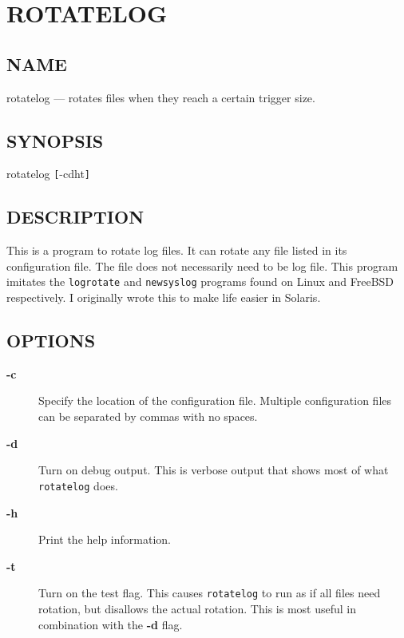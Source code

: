 \documentclass{article}
\begin{document}
\section{ROTATELOG}%

\subsection*{NAME}
rotatelog --- rotates files when they reach a certain trigger size.

\subsection*{SYNOPSIS}
rotatelog {\tt [}-cdht{\tt ]}

\subsection*{DESCRIPTION}
This is a program to rotate log files.  It can rotate any file listed in
its configuration file.  The file does not necessarily need to be log
file.  This program imitates the {\tt logrotate} and {\tt newsyslog} programs
found on Linux and FreeBSD respectively.  I originally wrote this to
make life easier in Solaris.

\subsection*{OPTIONS}%

\begin{description}

\item[{\bf -c}]%
%

Specify the location of the configuration file.  Multiple configuration
files can be separated by commas with no spaces.

\item[{\bf -d}]%
%

Turn on debug output.  This is verbose output that shows most of what
{\tt rotatelog} does.

\item[{\bf -h}]%
%

Print the help information.

\item[{\bf -t}]%
%

Turn on the test flag.  This causes {\tt rotatelog} to run as if all files
need rotation, but disallows the actual rotation.  This is most useful
in combination with the {\bf -d} flag.

\end{description}
\end{document}
